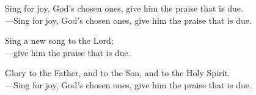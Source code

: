\responsory

\noindent Sing for joy, God’s chosen ones, give him the praise that is due.\\
{\color{red}---\thinspace}Sing for joy, God’s chosen ones, give him the praise that is due.

\medskip\noindent Sing a new song to the Lord;\\
{\color{red}---\thinspace}give him the praise that is due.

\medskip\noindent Glory to the Father, and to the Son, and to the Holy Spirit.\\
{\color{red}---\thinspace}Sing for joy, God’s chosen ones, give him the praise that is due.